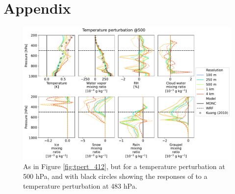 \documentclass[draft]{agujournal2019}
\begin{document}
%



\newpage
\section*{Appendix}
\setcounter{figure}{0}
\renewcommand{\thefigure}{A\arabic{figure}}

\begin{figure}[pth]
    \noindent\includegraphics[width=\textwidth]{figures/pert_diffs_T_0.5_@500}
    \caption{As in Figure \ref{fig:tpert_412}, but for a temperature
    perturbation at 500 hPa, and with black circles showing the responses of
     to a temperature perturbation at 483 hPa.}
    \label{fig:tpert_500}
\end{figure}
\end{document}
